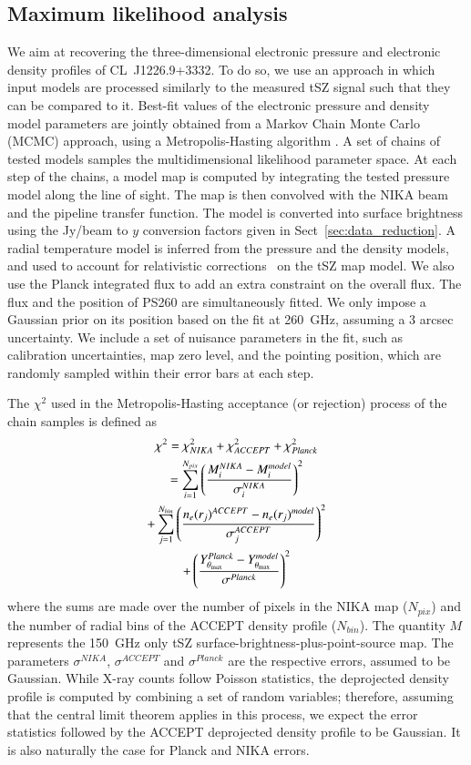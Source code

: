 \documentclass[twocolumn,traditabstract]{aa}
\begin{document}
\subsection{Maximum likelihood analysis}\label{sec:param_estim}
We aim at recovering the three-dimensional electronic pressure and electronic density profiles of \mbox{CL~J1226.9+3332}. To do so, we use an approach in which input models are processed similarly to the measured tSZ signal such that they can be compared to it. Best-fit values of the electronic pressure and density model parameters are jointly obtained from a Markov Chain Monte Carlo (MCMC) approach, using a Metropolis-Hasting algorithm \citep{chib1995}. A set of chains of tested models samples the multidimensional likelihood parameter space. At each step of the chains, a model map is computed by integrating the tested pressure model along the line of sight. The map is then convolved with the NIKA beam and the pipeline transfer function. The model is converted into surface brightness using the Jy/beam to $y$ conversion factors given in Sect~\ref{sec:data_reduction}. A radial temperature model is inferred from the pressure and the density models, and used to account for relativistic corrections~\citep{itoh1998} on the tSZ map model. We also use the Planck integrated flux to add an extra constraint on the overall flux. The flux and the position of PS260 are simultaneously fitted. We only impose a Gaussian prior on its position based on the fit at 260~GHz, assuming a 3 arcsec uncertainty. We include a set of nuisance parameters in the fit, such as calibration uncertainties, map zero level, and the pointing position, which are randomly sampled within their error bars at each step. 

The $\chi^2$ used in the Metropolis-Hasting acceptance (or rejection) process of the chain samples is defined as
\begin{multline}
\chi^2 = \chi^2_{NIKA} + \chi^2_{ACCEPT} + \chi^2_{Planck} \\
          = \sum_{i=1}^{N_{pix}} \left(\frac{M^{NIKA}_i - M^{model}_i}{\sigma_i^{NIKA}}\right)^2 \\
          + \sum_{j=1}^{N_{bin}} \left(\frac{n_e(r_j)^{ACCEPT} - n_e(r_j)^{model}}{\sigma_j^{ACCEPT}}\right)^2 \\
          + \left(\frac{Y^{Planck}_{\theta_{\rm max}} - Y^{model}_{\theta_{\rm max}}}{\sigma^{Planck}}\right)^2
\label{eq:chi2}
\end{multline}
where the sums are made over the number of pixels in the NIKA map ($N_{pix}$) and the number of radial bins of the ACCEPT density profile ($N_{bin}$). The quantity $M$ represents the 150~GHz only tSZ surface-brightness-plus-point-source map. The parameters $\sigma^{NIKA}$, $\sigma^{ACCEPT}$ and $\sigma^{Planck}$ are the respective errors, assumed to be Gaussian. While \mbox{X-ray} counts follow Poisson statistics, the deprojected density profile is computed by combining a set of random variables; therefore, assuming that the central limit theorem applies in this process, we expect the error statistics followed by the ACCEPT deprojected density profile to be Gaussian. It is also naturally the case for Planck and NIKA errors. 
\end{document}
